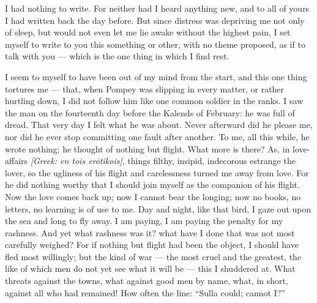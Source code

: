 

 I had nothing to write. For neither had I heard anything new, and to all of yours I had written back the day before. But since distress was depriving me not only of sleep, but would not even let me lie awake without the highest pain, I set myself to write to you this something or other, with no theme proposed, as if to talk with you --- which is the one thing in which I find rest.

 I seem to myself to have been out of my mind from the start, and this one thing tortures me --- that, when Pompey was slipping in every matter, or rather hurtling down, I did not follow him like one common soldier in the ranks. I saw the man on the fourteenth day before the Kalends of February: he was full of dread. That very day I felt what he was about. Never afterward did he please me, nor did he ever stop committing one fault after another. To me, all this while, he wrote nothing; he thought of nothing but flight. What more is there? As, in love-affairs \textit{[Greek: en tois er\=otikois]}, things filthy, insipid, indecorous estrange the lover, so the ugliness of his flight and carelessness turned me away from love. For he did nothing worthy that I should join myself as the companion of his flight. Now the love comes back up; now I cannot bear the longing; now no books, no letters, no learning is of use to me. Day and night, like that bird, I gaze out upon the sea and long to fly away. I am paying, I am paying the penalty for my rashness. And yet what rashness was it? what have I done that was not most carefully weighed? For if nothing but flight had been the object, I should have fled most willingly; but the kind of war --- the most cruel and the greatest, the like of which men do not yet see what it will be --- this I shuddered at. What threats against the towns, what against good men by name, what, in short, against all who had remained! How often the line: ``Sulla could; cannot I?''

